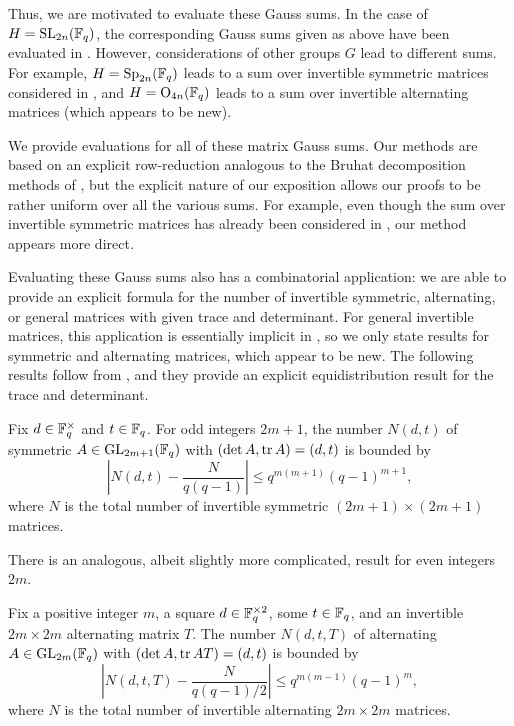 \documentclass{amsart}
\begin{document}
Thus, we are motivated to evaluate these Gauss sums. In the case of $H=\mathrm{SL}_{2n}(\mathbb F_q)$, the corresponding Gauss sums given as above have been evaluated in \cite{kim-gauss-sum}. However, considerations of other groups $G$ lead to different sums. For example, $H=\mathrm{Sp}_{2n}(\mathbb F_q)$ leads to a sum over invertible symmetric matrices considered in \cite{saito-sym-gauss-sum}, and $H=\mathrm{O}_{4n}(\mathbb F_q)$ leads to a sum over invertible alternating matrices (which appears to be new).

We provide evaluations for all of these matrix Gauss sums. Our methods are based on an explicit row-reduction analogous to the Bruhat decomposition methods of \cite{kim-gauss-sum}, but the explicit nature of our exposition allows our proofs to be rather uniform over all the various sums. For example, even though the sum over invertible symmetric matrices has already been considered in \cite{saito-sym-gauss-sum}, our method appears more direct.

Evaluating these Gauss sums also has a combinatorial application: we are able to provide an explicit formula for the number of invertible symmetric, alternating, or general matrices with given trace and determinant. For general invertible matrices, this application is essentially implicit in \cite[Theorem~6.2]{kim-gauss-sum}, so we only state results for symmetric and alternating matrices, which appear to be new. The following results follow from , and they provide an explicit equidistribution result for the trace and determinant.
\begin{theorem}
    Fix $d\in\mathbb F_q^\times$ and $t\in\mathbb F_q$. For odd integers $2m+1$, the number $N(d,t)$ of symmetric $A\in\mathrm{GL}_{2m+1}(\mathbb F_q)$ with $(\det A,\operatorname{tr} A)=(d,t)$ is bounded by
    \[\left|N(d,t)-\frac N{q(q-1)}\right|\le q^{m(m+1)}(q-1)^{m+1},\]
    where $N$ is the total number of invertible symmetric $(2m+1)\times(2m+1)$ matrices.
\end{theorem}
\begin{remark}
    There is an analogous, albeit slightly more complicated, result for even integers $2m$.
\end{remark}
\begin{theorem}
    Fix a positive integer $m$, a square $d\in\mathbb F_q^{\times2}$, some $t\in\mathbb F_q$, and an invertible $2m\times2m$ alternating matrix $T$. The number $N(d,t,T)$ of alternating $A\in\mathrm{GL}_{2m}(\mathbb F_q)$ with $(\det A,\operatorname{tr} AT)=(d,t)$ is bounded by
    \[\left|N(d,t,T)-\frac N{q(q-1)/2}\right|\le q^{m(m-1)}(q-1)^m,\]
    where $N$ is the total number of invertible alternating $2m\times2m$ matrices.
\end{theorem}
\end{document}

